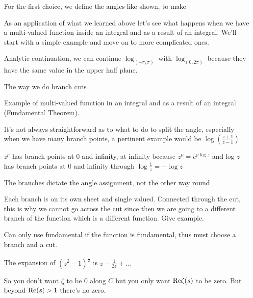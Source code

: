 \documentclass[aps,preprint,preprintnumbers,nofootinbib,showpacs,prd]{revtex4-1}
\newcommand{\re}{{\rm Re}}
\begin{document}
For the first choice, we define the angles like shown, to make

 


As an application of what we learned above let's see what happens when we have a multi-valued function inside an integral and as a result of an integral. We'll start with a simple example and move on to more complicated ones.





Analytic continuation, we can continue $\log_{(-\pi,\pi)}$ with $\log_{(0,2\pi)}$ because they have the same value in the upper half plane.






The way we do branch cuts



Example of multi-valued function in an integral and as a result of an integral (Fundamental Theorem).

It's not always straightforward as to what to do to split the angle, especially when we have many branch points, a pertinent example would be $\log\left ( \tfrac{z+1}{z-1}\right )$













$z^p$ has branch points at 0 and infinity, at infinity because $z^p = e^{p \log z}$ and log $z$ has branch points at 0 and infinity through $\log \tfrac{1}{z} = -\log z$



The branches dictate the angle assignment, not the other way round

Each branch is on its own sheet and single valued. Connected through the cut, this is why we cannot go across the cut since then we are going to a different branch of the function which is a different function. Give example.

Can only use fundamental if the function is fundamental, thus must choose a branch and a cut.

The expansion of $(z^2 - 1)^{\tfrac{1}{2}}$ is $z - \frac{1}{2z} + \dots$










So you don't want $\zeta$ to be 0 along $C$ but you only want $\re \zeta(s)$ to be zero. But beyond $\re(s) > 1$ there's no zero.
\end{document}
